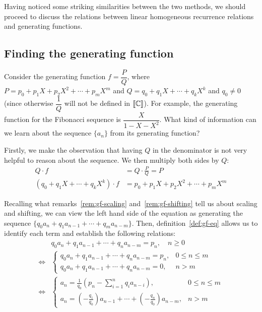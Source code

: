 \documentclass[a4paper, 12pt]{report}
\begin{document}
Having noticed some striking similarities between the two methods, we should proceed to discuss the relations between linear homogeneous recurrence relations and generating functions.

\subsection{Finding the generating function}
Consider the generating function $f = \dfrac{P}{Q}$, where $P = p_0 + p_1 X + p_2 X^2 + \cdots + p_m X^m$ and $Q = q_0 + q_1 X + \cdots + q_k X^k$ and $q_0 \neq 0$ (since otherwise $\dfrac{1}{Q}$ will not be defined in $\llbracket \mathbb{C} \rrbracket$). For example, the generating function for the Fibonacci sequence is $\dfrac{X}{1 - X - X^2}$. What kind of information can we learn about the sequence $\{a_n\}$ from its generating function?

Firstly, we make the observation that having $Q$ in the denominator is not very helpful to reason about the sequence. We then multiply both sides by $Q$:
\begin{align*}
    Q \cdot f &= Q \cdot \frac{P}{Q} = P\\
    (q_0 + q_1 X + \cdots + q_k X^k) \cdot f &= p_0 + p_1 X + p_2 X^2 + \cdots + p_m X^m
\end{align*}

Recalling what remarks~\ref{rem:gf-scaling} and~\ref{rem:gf-shifting} tell us about scaling and shifting, we can view the left hand side of the equation as generating the sequence $\{q_0 a_n + q_1 a_{n - 1} + \cdots + q_m a_{n - m}\}$. Then, definition~\ref{def:gf-eq} allows us to identify each term and establish the following relations:
\begin{align*}\label{eq:rec-reational-fxn}
&q_0 a_n + q_1 a_{n - 1} + \cdots + q_n a_{n - m} = p_n, \quad n \geq 0\\
\iff &\begin{cases}
    q_0 a_n + q_1 a_{n - 1} + \cdots + q_n a_{n - m} = p_n, & 0 \leq n \leq m\\
    q_0 a_n + q_1 a_{n - 1} + \cdots + q_n a_{n - m} = 0,   & n > m
\end{cases}\\
\iff &\begin{cases}
    a_n = \frac{1}{q_0} (p_n - \sum_{i = 1}^{n} q_i a_{n - i}), & 0 \leq n \leq m \\
    a_n = (-\frac{q_1}{q_0}) a_{n - 1} + \cdots + (-\frac{q_n}{q_0}) a_{n - m}, & n > m 
\end{cases}\tag{**}
\end{align*}
\end{document}

